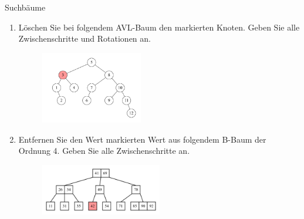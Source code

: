 \documentclass[11pt,a4paper]{article}
\begin{document}
\begin{aufgabe}{5}{Suchbäume}
    \begin{enumerate}
        \label{avl}
        \item Löschen Sie bei folgendem AVL-Baum den markierten Knoten. Geben Sie alle Zwischenschritte und Rotationen an.
        \begin{figure}[h!]
            \centering
            \includegraphics[width=0.42\textwidth]{img/avl.png}
        \end{figure}
        \FloatBarrier   
        \item Entfernen Sie den Wert markierten Wert aus folgendem B-Baum der Ordnung 4. Geben Sie alle Zwischenschritte an.
        \begin{figure}[h!]
            \centering
            \includegraphics[width=0.5\textwidth]{img/b_tree.png}
        \end{figure}
        \FloatBarrier   
    \end{enumerate}
\end{aufgabe}
\end{document}
